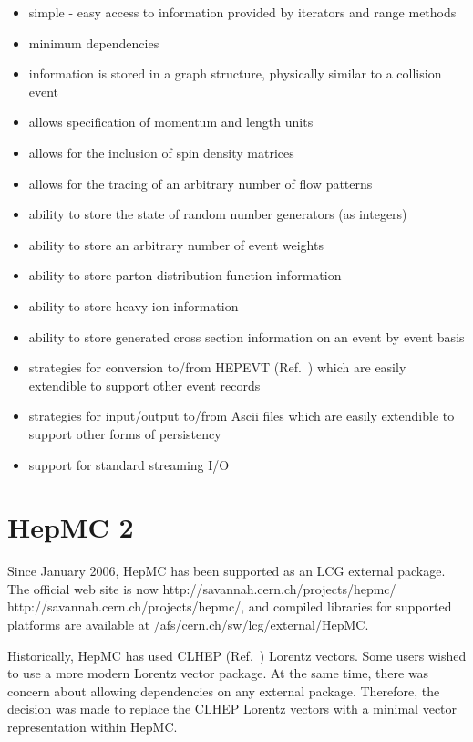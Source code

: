 \documentclass[11pt,letterpaper]{article}
\begin{document}
\begin{itemize}\setlength{\itemsep}{0pt}
\item simple - easy access to information provided by iterators
      and range methods
\item minimum dependencies
\item information is stored in a graph structure, 
  physically similar to a collision event
\item allows specification of momentum and length units
\item allows for the inclusion of spin density matrices 
\item allows for the tracing of an arbitrary number of flow patterns
\item ability to store the state of random number generators (as
  integers)
\item ability to store an arbitrary number of event weights
\item ability to store parton distribution function information
\item ability to store heavy ion information 
\item ability to store generated cross section information on
      an event by event basis
\item strategies for conversion to/from HEPEVT (Ref.~\cite{Boos:2001cv}) 
  which are easily extendible to support other event records
\item strategies for input/output to/from Ascii files which
  are easily extendible to support other forms of persistency
\item support for standard streaming I/O
\end{itemize}

%
%

\section{HepMC 2}

Since January 2006, HepMC has been supported as an LCG external package.
The official web site is now \htmladdnormallink 
{http://savannah.cern.ch/projects/hepmc/} 
{http://savannah.cern.ch/projects/hepmc/}, 
and compiled libraries for supported platforms are available at 
/afs/cern.ch/sw/lcg/external/HepMC.

Historically, HepMC has used CLHEP (Ref.~\cite{clhep}) Lorentz vectors.  Some users wished to use
a more modern Lorentz vector package.  At the same time, 
there was concern about allowing dependencies on any external package.  
Therefore, the decision was made to replace the CLHEP Lorentz vectors with
a minimal vector representation within HepMC.  
\end{document}
